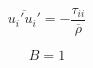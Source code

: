 

\begin{equation}
\overline{u_i'u_i'} = - \frac{\tau_{ii}}{\overline{\rho}}
\end{equation}

\begin{equation}
B=1
\end{equation}


